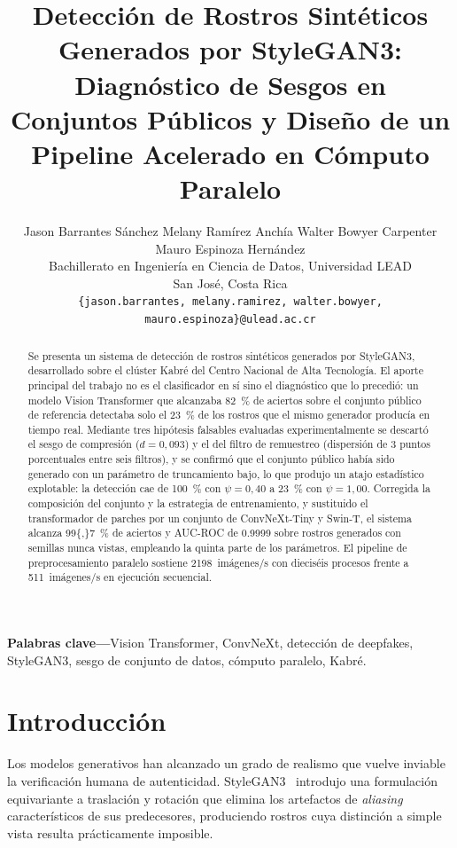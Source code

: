 \documentclass[10pt,twocolumn,letterpaper]{article}
\title{\vspace{-1.2em}\textbf{\large Detección de Rostros Sintéticos Generados por
StyleGAN3: Diagnóstico de Sesgos en Conjuntos Públicos y Diseño de un
Pipeline Acelerado en Cómputo Paralelo}\vspace{-0.3em}}
\author{
\begin{tabular}{c}
Jason Barrantes Sánchez \quad Melany Ramírez Anchía \quad
Walter Bowyer Carpenter \quad Mauro Espinoza Hernández \\[0.3em]
\small Bachillerato en Ingeniería en Ciencia de Datos, Universidad LEAD \\
\small San José, Costa Rica \\
\small \texttt{\{jason.barrantes, melany.ramirez, walter.bowyer,
mauro.espinoza\}@ulead.ac.cr}
\end{tabular}
}
\date{}
\begin{document}
\maketitle

\begin{abstract}
\small
Se presenta un sistema de detección de rostros sintéticos generados por
StyleGAN3, desarrollado sobre el clúster Kabré del Centro Nacional de Alta
Tecnología. El aporte principal del trabajo no es el clasificador en sí sino
el diagnóstico que lo precedió: un modelo Vision Transformer que alcanzaba
\SI{82}{\percent} de aciertos sobre el conjunto público de referencia
detectaba solo el \SI{23}{\percent} de los rostros que el mismo generador
producía en tiempo real. Mediante tres hipótesis falsables evaluadas
experimentalmente se descartó el sesgo de compresión ($d=0{,}093$) y el del
filtro de remuestreo (dispersión de \num{3} puntos porcentuales entre seis
filtros), y se confirmó que el conjunto público había sido generado con un
parámetro de truncamiento bajo, lo que produjo un atajo estadístico
explotable: la detección cae de \SI{100}{\percent} con $\psi=0{,}40$ a
\SI{23}{\percent} con $\psi=1{,}00$. Corregida la composición del conjunto y
la estrategia de entrenamiento, y sustituido el transformador de parches por
un conjunto de ConvNeXt-Tiny y Swin-T, el sistema alcanza
\SI{99{,}7}{\percent} de aciertos y AUC-ROC de \num{0.9999} sobre rostros
generados con semillas nunca vistas, empleando la quinta parte de los
parámetros. El pipeline de preprocesamiento paralelo sostiene
\num{2198}~im\'agenes/s con dieciséis procesos frente a
\num{511}~im\'agenes/s en ejecución secuencial.
\end{abstract}

\vspace{0.4em}
\noindent\textbf{\small Palabras clave---}{\small Vision Transformer, ConvNeXt,
detección de deepfakes, StyleGAN3, sesgo de conjunto de datos, cómputo
paralelo, Kabré.}
\vspace{0.8em}

\section{Introducción}

Los modelos generativos han alcanzado un grado de realismo que vuelve
inviable la verificación humana de autenticidad. StyleGAN3~\cite{karras2021}
introdujo una formulación equivariante a traslación y rotación que elimina
los artefactos de \emph{aliasing} característicos de sus predecesores,
produciendo rostros cuya distinción a simple vista resulta prácticamente
imposible.
\end{document}
